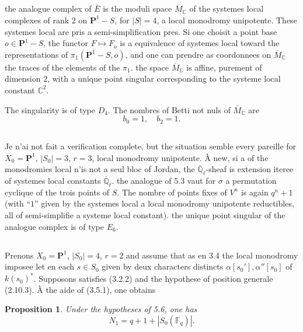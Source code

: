 \documentclass[11pt,a4paper]{article}
\theoremstyle{plain}
\newtheorem{proposition}[theorem]{Proposition}
\theoremstyle{definition}
\newcommand{\F}{\mathbb{F}}
\newcommand{\C}{\mathbb{C}}
\newcommand{\Ql}{\overline{\mathbb{Q}}_\ell}
\begin{document}
\subsection{}
the analogue complex of $\overline{E}$ is the moduli space $\overline{M}_\C$ of the systemes local complexes of rank $2$ on $\mathbf{P}^1 - S$, for $|S| = 4$, a local monodromy unipotente. These systemes local are pris a semi-simplification pres. Si one choisit a point base $o \in \mathbf{P}^1 - S$, the functor $F \mapsto F_o$ is a equivalence of systemes local toward the representations of $\pi_1(\mathbf{P}^1 - S, o)$, and one can prendre as coordonnees on $\overline{M}_\C$ the traces of the elements of the $\pi_1$. the space $\overline{M}_\C$ is affine, purement of dimension $2$, with a unique point singular corresponding to the systeme local constant $\C^2$.

The singularity is of type $D_4$. The nombres of Betti not nuls of $\overline{M}_\C$ are
\begin{equation}
b_0 = 1, \quad b_2 = 1.
\tag{5.4.1}
\end{equation}

\subsection{}
Je n'ai not fait a verification complete, but the situation semble every pareille for $X_0 = \mathbf{P}^1$, $|S_0| = 3$, $r = 3$, local monodromy unipotente. \`A new, si a of the monodromies local n'is not a seul bloc of Jordan, the $\Ql$-sheaf is extension iteree of systemes local constants $\Ql$. the analogue of 5.3 vaut for $\sigma$ a permutation cyclique of the trois points of $S$. The nombre of points fixes of $V^n$ is again $q^n + 1$ (with ``$1$'' given by the systemes local a local monodromy unipotente reductibles, all of semi-simplifie a systeme local constant). the unique point singular of the analogue complex is of type $E_6$.

\subsection{}
Prenons $X_0 = \mathbf{P}^1$, $|S_0| = 4$, $r = 2$ and assume that as en 3.4 the local monodromy imposee let en each $s \in S_0$ given by deux characters distincts $\alpha[s_0'], \alpha''[s_0]$ of $k(s_0)^*$. Supposons satisfies (3.2.2) and the hypothese of position generale (2.10.3). \`A the aide of (3.5.1), one obtains

\begin{proposition}
Under the hypotheses of 5.6, one has
\begin{equation}
N_1 = q + 1 + |S_0(\F_q)|.
\tag{5.7.1}
\end{equation}
\end{proposition}
\end{document}

